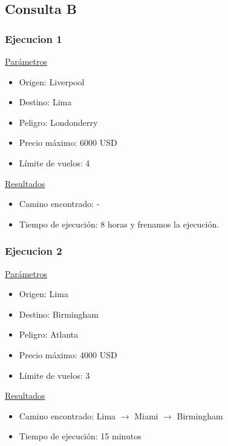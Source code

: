 \documentclass[a4paper,11pt]{article}
\begin{document}
\subsection*{Consulta B}
\subsubsection*{Ejecucion 1}
\noindent
\underline{Parámetros}
\begin{itemize}
\item Origen: Liverpool
\item Destino: Lima
\item Peligro: Londonderry
\item Precio máximo: 6000 USD
\item Límite de vuelos: 4
\end{itemize}
\underline{Resultados}
\begin{itemize}
\item Camino encontrado: -
\item Tiempo de ejecución: 8 horas y frenamos la ejecución.
\end{itemize}

\subsubsection*{Ejecucion 2}
\underline{Parámetros}
\begin{itemize}
\item Origen: Lima
\item Destino: Birmingham
\item Peligro: Atlanta
\item Precio máximo: 4000 USD
\item Límite de vuelos: 3
\end{itemize}
\underline{Resultados}
\begin{itemize}
\item Camino encontrado: Lima $\rightarrow$ Miami $\rightarrow$ Birmingham
\item Tiempo de ejecución: 15 minutos
\end{itemize}
\end{document}
